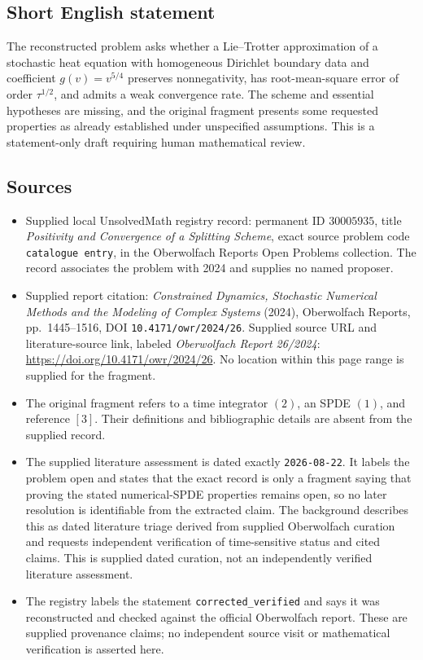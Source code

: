 \documentclass[11pt]{article}
\begin{document}
\subsection{Short English statement}
The reconstructed problem asks whether a Lie--Trotter approximation of a stochastic heat equation with homogeneous Dirichlet boundary data and coefficient \(g(v)=v^{5/4}\) preserves nonnegativity, has root-mean-square error of order \(\tau^{1/2}\), and admits a weak convergence rate. The scheme and essential hypotheses are missing, and the original fragment presents some requested properties as already established under unspecified assumptions. This is a statement-only draft requiring human mathematical review.
\subsection{Sources}
\begin{itemize}
\item Supplied local UnsolvedMath registry record: permanent ID \(30005935\), title \emph{Positivity and Convergence of a Splitting Scheme}, exact source problem code \texttt{catalogue entry}, in the Oberwolfach Reports Open Problems collection. The record associates the problem with 2024 and supplies no named proposer.
\item Supplied report citation: \emph{Constrained Dynamics, Stochastic Numerical Methods and the Modeling of Complex Systems} (2024), Oberwolfach Reports, pp.\ 1445--1516, DOI \texttt{10.4171/owr/2024/26}. Supplied source URL and literature-source link, labeled \emph{Oberwolfach Report 26/2024}: \url{https://doi.org/10.4171/owr/2024/26}. No location within this page range is supplied for the fragment.
\item The original fragment refers to a time integrator \((2)\), an SPDE \((1)\), and reference \([3]\). Their definitions and bibliographic details are absent from the supplied record.
\item The supplied literature assessment is dated exactly \texttt{2026-08-22}. It labels the problem open and states that the exact record is only a fragment saying that proving the stated numerical-SPDE properties remains open, so no later resolution is identifiable from the extracted claim. The background describes this as dated literature triage derived from supplied Oberwolfach curation and requests independent verification of time-sensitive status and cited claims. This is supplied dated curation, not an independently verified literature assessment.
\item The registry labels the statement \texttt{corrected\_verified} and says it was reconstructed and checked against the official Oberwolfach report. These are supplied provenance claims; no independent source visit or mathematical verification is asserted here.
\end{itemize}
\end{document}
